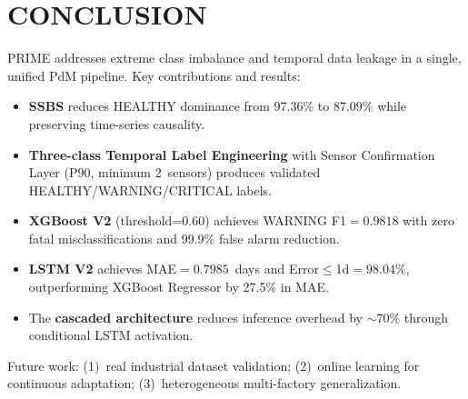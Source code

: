 \documentclass[conference]{IEEEtran}
\begin{document}
\section{CONCLUSION}

PRIME addresses extreme class imbalance and temporal data leakage in a
single, unified PdM pipeline. Key contributions and results:

\begin{itemize}
\item \textbf{SSBS} reduces HEALTHY dominance from 97.36\% to 87.09\%
  while preserving time-series causality.

\item \textbf{Three-class Temporal Label Engineering} with Sensor
  Confirmation Layer (P90, minimum 2~sensors) produces validated
  HEALTHY/WARNING/CRITICAL labels.

\item \textbf{XGBoost V2} (threshold=0.60) achieves WARNING F1$=0.9818$
  with zero fatal misclassifications and 99.9\% false alarm reduction.

\item \textbf{LSTM V2} achieves MAE$=0.7985$~days and Error$\leq$1d$=98.04\%$,
  outperforming XGBoost Regressor by 27.5\% in MAE.

\item The \textbf{cascaded architecture} reduces inference overhead by
  $\sim$70\% through conditional LSTM activation.
\end{itemize}

Future work: (1)~real industrial dataset validation; (2)~online learning for
continuous adaptation; (3)~heterogeneous multi-factory generalization.

\end{document}

